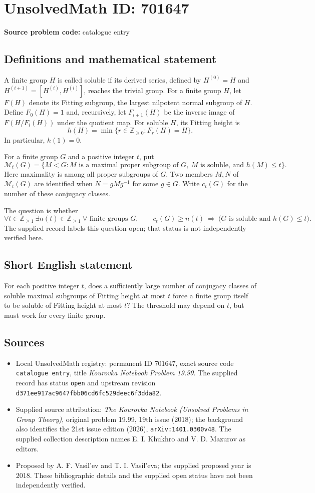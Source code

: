 \documentclass[11pt]{article}
\newcommand{\Z}{\mathbb{Z}}
\begin{document}
\section*{UnsolvedMath ID: 701647}
\textbf{Source problem code:} catalogue entry
\subsection{Definitions and mathematical statement}
A finite group \(H\) is called soluble if its derived series, defined by \(H^{(0)}=H\) and \(H^{(i+1)}=[H^{(i)},H^{(i)}]\), reaches the trivial group. For a finite group \(H\), let \(F(H)\) denote its Fitting subgroup, the largest nilpotent normal subgroup of \(H\). Define \(F_0(H)=1\) and, recursively, let \(F_{i+1}(H)\) be the inverse image of \(F(H/F_i(H))\) under the quotient map. For soluble \(H\), its Fitting height is
\[
h(H)=\min\{r\in\Z_{\geq 0}:F_r(H)=H\}.
\]
In particular, \(h(1)=0\).

For a finite group \(G\) and a positive integer \(t\), put
\[
\mathcal M_t(G)=\{M<G:M\text{ is a maximal proper subgroup of }G,\ M\text{ is soluble, and }h(M)\leq t\}.
\]
Here maximality is among all proper subgroups of \(G\). Two members \(M,N\) of \(\mathcal M_t(G)\) are identified when \(N=gMg^{-1}\) for some \(g\in G\). Write \(c_t(G)\) for the number of these conjugacy classes.

The question is whether
\[
\forall t\in\Z_{\geq1}\ \exists n(t)\in\Z_{\geq1}\ \forall\text{ finite groups }G,\qquad
c_t(G)\geq n(t)\ \Longrightarrow\ \bigl(G\text{ is soluble and }h(G)\leq t\bigr).
\]
The supplied record labels this question open; that status is not independently verified here.
\subsection{Short English statement}
For each positive integer \(t\), does a sufficiently large number of conjugacy classes of soluble maximal subgroups of Fitting height at most \(t\) force a finite group itself to be soluble of Fitting height at most \(t\)? The threshold may depend on \(t\), but must work for every finite group.
\subsection{Sources}
\begin{itemize}
\item Local UnsolvedMath registry: permanent ID \(701647\), exact source code \texttt{catalogue entry}, title \emph{Kourovka Notebook Problem 19.99}. The supplied record has status \texttt{open} and upstream revision \texttt{d371ee917ac9647fbb06cd6fc529deec6f3dda82}.
\item Supplied source attribution: \emph{The Kourovka Notebook (Unsolved Problems in Group Theory)}, original problem 19.99, 19th issue (2018); the background also identifies the 21st issue edition (2026), \texttt{arXiv:1401.0300v48}. The supplied collection description names E. I. Khukhro and V. D. Mazurov as editors.
\item Proposed by A. F. Vasil'ev and T. I. Vasil'eva; the supplied proposed year is 2018. These bibliographic details and the supplied open status have not been independently verified.
\end{itemize}
\end{document}
